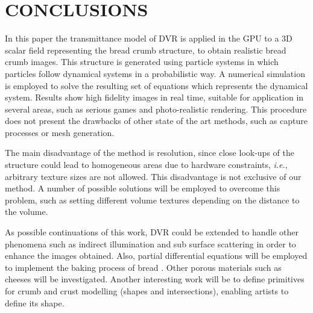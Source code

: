 \documentclass[oneside,a4paper,english,links]{amca}
\begin{document}

\section{CONCLUSIONS}

In this paper the transmittance model of DVR is applied in the GPU to a 3D scalar field representing the bread crumb structure, to obtain realistic bread crumb images. This structure is generated using particle systems in which particles follow dynamical systems in a probabilistic way. A numerical simulation is employed to solve the resulting set of equations which represents the dynamical system. Results show high fidelity images in real time, suitable for application in several areas, such as serious games \citep{Susi2007} and photo-realistic rendering. This procedure does not present the drawbacks of other state of the art methods, such as capture processes or mesh generation.

The main disadvantage of the method is resolution, since close look-ups of the structure could lead to homogeneous areas due to hardware constraints, {\em i.e.}, arbitrary texture sizes are not allowed. This disadvantage is not exclusive of our method. A number of possible solutions will be employed to overcome this problem, such as setting different volume textures depending on the distance to the volume. 

As possible continuations of this work, DVR could be extended to handle other phenomena such as indirect illumination and sub surface scattering in order to enhance the images obtained. Also, partial differential equations will be employed to implement the baking process of bread \citep{Purlis2012}. Other porous materials such as cheeses will be investigated. Another interesting work will be to define primitives for crumb and crust modelling (shapes and intersections), enabling artists to define its shape.

%

\end{document}
